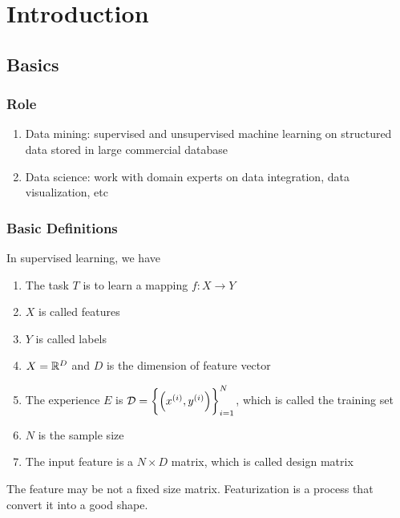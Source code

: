 \chapter{Introduction}

\section{Basics}

\subsection{Role}

\begin{enumerate}
    \item Data mining: supervised and unsupervised machine learning on structured data stored in large commercial database
    \item Data science: work with domain experts on data integration, data visualization, etc
\end{enumerate}

\subsection{Basic Definitions}

\begin{definition}
    In supervised learning, we have 
    \begin{enumerate}
        \item The task $T$ is to learn a mapping $f: X \rightarrow Y$
        \item $X$ is called features
        \item $Y$ is called labels
        \item $X = \mathbb{R}^D$ and $D$ is the dimension of feature vector
        \item The experience $E$ is $\mathcal{D} = \set{\left({x}^{(i)}, {y}^{(i)}\right)}_{i=1}^N$, which is called the training set
        \item $N$ is the sample size
        \item The input feature is a $N \times D$ matrix, which is called design matrix
    \end{enumerate}
\end{definition}



The feature may be not a fixed size matrix. Featurization is a process that convert it into a good shape.


